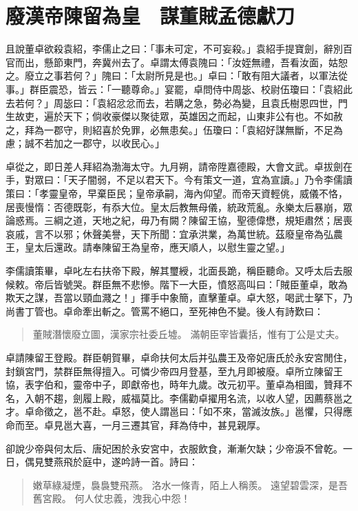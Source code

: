 
\chapter{廢漢帝陳留為皇　謀董賊孟德獻刀}

且說董卓欲殺袁紹，李儒止之曰：「事未可定，不可妄殺。」袁紹手提寶劍，辭別百官而出，懸節東門，奔冀州去了。卓謂太傅袁隗曰：「汝姪無禮，吾看汝面，姑恕之。廢立之事若何？」隗曰：「太尉所見是也。」卓曰：「敢有阻大議者，以軍法從事。」群臣震恐，皆云：「一聽尊命。」宴罷，卓問侍中周毖、校尉伍瓊曰：「袁紹此去若何？」周毖曰：「袁紹忿忿而去，若購之急，勢必為變，且袁氏樹恩四世，門生故吏，遍於天下；倘收豪傑以聚徒眾，英雄因之而起，山東非公有也。不如赦之，拜為一郡守，則紹喜於免罪，必無患矣。」伍瓊曰：「袁紹好謀無斷，不足為慮；誠不若加之一郡守，以收民心。」

卓從之，即日差人拜紹為渤海太守。九月朔，請帝陞嘉德殿，大會文武。卓拔劍在手，對眾曰：「天子闇弱，不足以君天下。今有策文一道，宜為宣讀。」乃令李儒讀策曰：「孝靈皇帝，早棄臣民；皇帝承嗣，海內仰望。而帝天資輕佻，威儀不恪，居喪慢惰：否德既彰，有忝大位。皇太后教無母儀，統政荒亂。永樂太后暴崩，眾論惑焉。三綱之道，天地之紀，毋乃有闕？陳留王協，聖德偉懋，規矩肅然；居喪哀戚，言不以邪；休聲美譽，天下所聞：宜承洪業，為萬世統。茲廢皇帝為弘農王，皇太后還政。請奉陳留王為皇帝，應天順人，以慰生靈之望。」

李儒讀策畢，卓叱左右扶帝下殿，解其璽綬，北面長跪，稱臣聽命。又呼太后去服候敕。帝后皆號哭。群臣無不悲慘。階下一大臣，憤怒高叫曰：「賊臣董卓，敢為欺天之謀，吾當以頸血濺之！」揮手中象簡，直擊董卓。卓大怒，喝武士拏下，乃尚書丁管也。卓命牽出斬之。管罵不絕口，至死神色不變。後人有詩歎曰：

\begin{quote}
董賊潛懷廢立圖，漢家宗社委丘墟。
滿朝臣宰皆囊括，惟有丁公是丈夫。
\end{quote}

卓請陳留王登殿。群臣朝賀畢，卓命扶何太后并弘農王及帝妃唐氏於永安宮閒住，封鎖宮門，禁群臣無得擅入。可憐少帝四月登基，至九月即被廢。卓所立陳留王協，表字伯和，靈帝中子，即獻帝也，時年九歲。改元初平。董卓為相國，贊拜不名，入朝不趨，劍履上殿，威福莫比。李儒勸卓擢用名流，以收人望，因薦蔡邕之才。卓命徵之，邕不赴。卓怒，使人謂邕曰：「如不來，當滅汝族。」邕懼，只得應命而至。卓見邕大喜，一月三遷其官，拜為侍中，甚見親厚。

卻說少帝與何太后、唐妃困於永安宮中，衣服飲食，漸漸欠缺；少帝淚不曾乾。一日，偶見雙燕飛於庭中，遂吟詩一首。詩曰：

\begin{quote}
嫩草綠凝煙，裊裊雙飛燕。
洛水一條青，陌上人稱羨。
遠望碧雲深，是吾舊宮殿。
何人仗忠義，洩我心中怨！
\end{quote}

